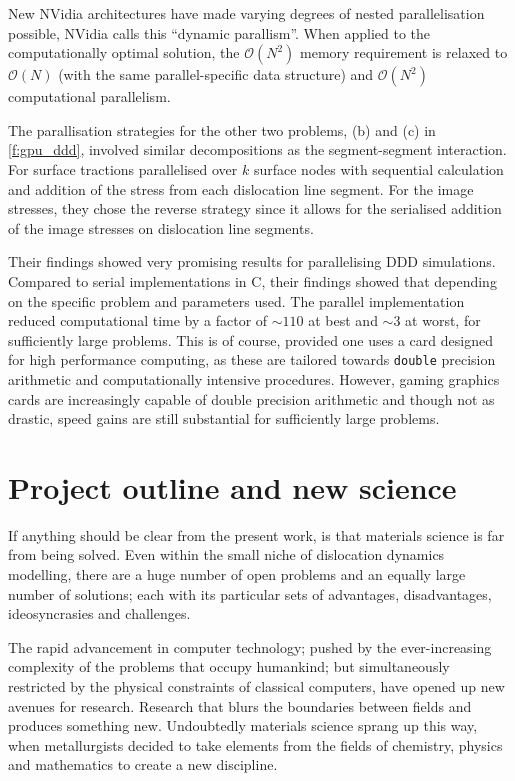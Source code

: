 New NVidia architectures have made varying degrees of nested parallelisation possible, NVidia calls this ``dynamic parallism''. When applied to the computationally optimal solution, the $ \mathcal{O}(N^{2}) $ memory requirement is relaxed to $ \mathcal{O}(N) $ (with the same parallel-specific data structure) and $ \mathcal{O}(N^{2}) $ computational parallelism.

The parallisation strategies for the other two problems, (b) and (c) in \cref{f:gpu_ddd}, involved similar decompositions as the segment-segment interaction. For surface tractions \citet{gpu_ddd} parallelised over $ k $ surface nodes with sequential calculation and addition of the stress from each dislocation line segment. For the image stresses, they chose the reverse strategy since it allows for the serialised addition of the image stresses on dislocation line segments.

Their findings showed very promising results for parallelising DDD simulations. Compared to serial implementations in C, their findings showed that depending on the specific problem and parameters used. The parallel implementation reduced computational time by a factor of $ \sim 110 $ at best and $ \sim 3 $ at worst, for sufficiently large problems. This is of course, provided one uses a card designed for high performance computing, as these are tailored towards \texttt{double} precision arithmetic and computationally intensive procedures. However, gaming graphics cards are increasingly capable of double precision arithmetic and though not as drastic, speed gains are still substantial for sufficiently large problems.

\section{Project outline and new science}
\label{s:objectives}

If anything should be clear from the present work, is that materials science is far from being solved. Even within the small niche of dislocation dynamics modelling, there are a huge number of open problems and an equally large number of solutions; each with its particular sets of advantages, disadvantages, ideosyncrasies and challenges.

The rapid advancement in computer technology; pushed by the ever-increasing complexity of the problems that occupy humankind; but simultaneously restricted by the physical constraints of classical computers, have opened up new avenues for research. Research that blurs the boundaries between fields and produces something new. Undoubtedly materials science sprang up this way, when metallurgists decided to take elements from the fields of chemistry, physics and mathematics to create a new discipline.

